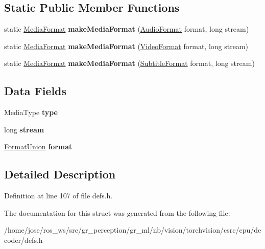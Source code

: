 \subsection*{Static Public Member Functions}
\begin{DoxyCompactItemize}
\item 
\mbox{\label{structffmpeg_1_1MediaFormat_ad89f1deeda1fd09b33ab4b5cc893526b}} 
static \hyperlink{structffmpeg_1_1MediaFormat}{Media\+Format} {\bfseries make\+Media\+Format} (\hyperlink{structffmpeg_1_1AudioFormat}{Audio\+Format} format, long stream)
\item 
\mbox{\label{structffmpeg_1_1MediaFormat_a1f3f729b2b2a3e5aaad421437dc2877f}} 
static \hyperlink{structffmpeg_1_1MediaFormat}{Media\+Format} {\bfseries make\+Media\+Format} (\hyperlink{structffmpeg_1_1VideoFormat}{Video\+Format} format, long stream)
\item 
\mbox{\label{structffmpeg_1_1MediaFormat_a258272cd8dca8bfe73772b5a6bbca143}} 
static \hyperlink{structffmpeg_1_1MediaFormat}{Media\+Format} {\bfseries make\+Media\+Format} (\hyperlink{structffmpeg_1_1SubtitleFormat}{Subtitle\+Format} format, long stream)
\end{DoxyCompactItemize}
\subsection*{Data Fields}
\begin{DoxyCompactItemize}
\item 
\mbox{\label{structffmpeg_1_1MediaFormat_a62b0f887fdeb426fd1c44eb70ba86325}} 
Media\+Type {\bfseries type}
\item 
\mbox{\label{structffmpeg_1_1MediaFormat_a0e81928ba3fce0caa77c667c20dd5024}} 
long {\bfseries stream}
\item 
\mbox{\label{structffmpeg_1_1MediaFormat_a735ab7603d2f66b8795bdc95f487c8b7}} 
\hyperlink{unionffmpeg_1_1FormatUnion}{Format\+Union} {\bfseries format}
\end{DoxyCompactItemize}


\subsection{Detailed Description}


Definition at line 107 of file defs.\+h.



The documentation for this struct was generated from the following file\+:\begin{DoxyCompactItemize}
\item 
/home/jose/ros\+\_\+ws/src/gr\+\_\+perception/gr\+\_\+ml/nb/vision/torchvision/csrc/cpu/decoder/defs.\+h\end{DoxyCompactItemize}
